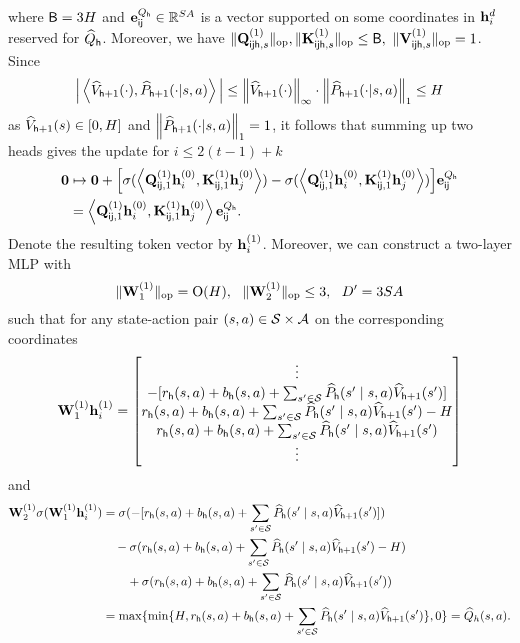 where ${\mathsf{B}}=3{H}$ and ${\mathbf e}^{{Q}_{\mathsf{h}}}_{{\mathsf{i}}{\mathsf{j}}}\in\mathbb{R}^{{S}{A}}$ is a vector supported on some coordinates in ${\mathbf h}^{d}_i$ reserved for ${\widehat{{Q}}}_{\mathsf{h}}$. Moreover, we have $\|{{\mathbf Q}^{(1)}_{{\mathsf{i}}{\mathsf{j}}{\mathsf{h}},s}}\|_{\mathrm{op}},\|{{\mathbf K}^{(1)}_{{\mathsf{i}}{\mathsf{j}}{\mathsf{h}},s}}\|_{\mathrm{op}}\leq {\mathsf{B}},~\|{{\mathbf V}^{(1)}_{{\mathsf{i}}{\mathsf{j}}{\mathsf{h}},s}}\|_{\mathrm{op}}=1$. 
Since $$\Big|\left\langle{\widehat{{{V}}}}_{{\mathsf{h}}+1}(\cdot),\widehat{P}_{{\mathsf{h}}+1}(\cdot|{s},{a})\right\rangle\Big|\leq \left\|{{\widehat{{{V}}}}_{{\mathsf{h}}+1}(\cdot)}\right\|_\infty\cdot\left\|{\widehat{P}_{{\mathsf{h}}+1}(\cdot|{s},{a})}\right\|_1\leq{H}$$ as ${\widehat{{{V}}}}_{{\mathsf{h}}+1}({s})\in[0,{H}]$ and $\left\|{\widehat{P}_{{\mathsf{h}}+1}(\cdot|{s},{a})}\right\|_1=1$, it follows that summing up two heads gives the update for $i\leq 2(t-1)+k$
\begin{align*}
{\mathbf 0}
&\mapsto{\mathbf 0}+\Big[\sigma(\left\langle {\mathbf Q}_{{\mathsf{i}}{\mathsf{j}},1}^{(1)}{\mathbf h}_i^{(0)} , {\mathbf K}_{{\mathsf{i}}{\mathsf{j}},1}^{(1)}{\mathbf h}_j^{(0)} \right\rangle)-\sigma(\left\langle {\mathbf Q}_{{\mathsf{i}}{\mathsf{j}},1}^{(1)}{\mathbf h}_i^{(0)} , {\mathbf K}_{{\mathsf{i}}{\mathsf{j}},1}^{(1)}{\mathbf h}_j^{(0)} \right\rangle)\Big]{\mathbf e}_{{\mathsf{i}}{\mathsf{j}}}^{{Q}_{\mathsf{h}}}\\
&=\left\langle {\mathbf Q}_{{\mathsf{i}}{\mathsf{j}},1}^{(1)}{\mathbf h}_i^{(0)} , {\mathbf K}_{{\mathsf{i}}{\mathsf{j}},1}^{(1)}{\mathbf h}_j^{(0)} \right\rangle{\mathbf e}_{{\mathsf{i}}{\mathsf{j}}}^{{Q}_{\mathsf{h}}}.
\end{align*}
Denote the resulting token vector by ${\mathbf h}_i^{(1)}$. 
Moreover, we can construct a two-layer MLP with $$\|{{\mathbf W}^{(1)}_1}\|_{\mathrm{op}}={\mathrm{O}}({H}),~~ \|{{\mathbf W}^{(1)}_2}\|_{\mathrm{op}}\leq 3,~~{D'}=3{S}{A}$$
such that for any state-action pair $({s},{a})\in{\mathcal{S}}\times{\mathcal{A}}$ on the corresponding coordinates
\begin{align*}
{\mathbf W}^{(1)}_1{\mathbf h}_i^{(1)}=
\begin{bmatrix}
\vdots\\-[{{r}}_{\mathsf{h}}({s},{a})+{b}_{\mathsf{h}}({s},{a})+\sum_{{s}'\in{\mathcal{S}}}\widehat{P}_{\mathsf{h}}({s}'\mid{s},{a}){\widehat{{{V}}}}_{{\mathsf{h}}+1}({s}')]
\\
{{r}}_{\mathsf{h}}({s},{a})+{b}_{\mathsf{h}}({s},{a})+\sum_{{s}'\in{\mathcal{S}}}\widehat{P}_{\mathsf{h}}({s}'\mid{s},{a}){\widehat{{{V}}}}_{{\mathsf{h}}+1}({s}')-{H}\\{{r}}_{\mathsf{h}}({s},{a})+{b}_{\mathsf{h}}({s},{a})+\sum_{{s}'\in{\mathcal{S}}}\widehat{P}_{\mathsf{h}}({s}'\mid{s},{a}){\widehat{{{V}}}}_{{\mathsf{h}}+1}({s}')\\\vdots
\end{bmatrix}
\end{align*}
 and \begin{align*}
  {\mathbf W}^{(1)}_2\sigma({\mathbf W}^{(1)}_1{\mathbf h}_i^{(1)})
  &=   \sigma(-[{{r}}_{\mathsf{h}}({s},{a})+{b}_{\mathsf{h}}({s},{a})+\sum_{{s}'\in{\mathcal{S}}}\widehat{P}_{\mathsf{h}}({s}'\mid{s},{a}){\widehat{{{V}}}}_{{\mathsf{h}}+1}({s}')])\\&\quad-\sigma({{r}}_{\mathsf{h}}({s},{a})+{b}_{\mathsf{h}}({s},{a})+\sum_{{s}'\in{\mathcal{S}}}\widehat{P}_{\mathsf{h}}({s}'\mid{s},{a}){\widehat{{{V}}}}_{{\mathsf{h}}+1}({s}')-{H})\\
&\qquad+\sigma({{r}}_{\mathsf{h}}({s},{a})+{b}_{\mathsf{h}}({s},{a})+\sum_{{s}'\in{\mathcal{S}}}\widehat{P}_{\mathsf{h}}({s}'\mid{s},{a}){\widehat{{{V}}}}_{{\mathsf{h}}+1}({s}'))\\
&=\max\{\min\{{H},{{r}}_{\mathsf{h}}({s},{a})+{b}_{\mathsf{h}}({s},{a})+\sum_{{s}'\in{\mathcal{S}}}\widehat{P}_{\mathsf{h}}({s}'\mid{s},{a}){\widehat{{{V}}}}_{{\mathsf{h}}+1}({s}')\},0\}={\widehat{{Q}}}_h({s},{a}).
 \end{align*}
